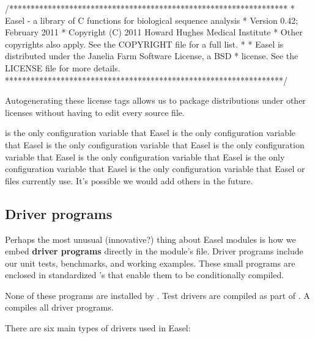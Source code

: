 \begin{cchunk}
/*****************************************************************
 * Easel - a library of C functions for biological sequence analysis
 * Version 0.42; February 2011
 * Copyright (C) 2011 Howard Hughes Medical Institute
 * Other copyrights also apply. See the COPYRIGHT file for a full list.
 *
 * Easel is distributed under the Janelia Farm Software License, a BSD
 * license. See the LICENSE file for more details.
 *****************************************************************/
\end{cchunk}

Autogenerating these license tags allows us to package distributions
under other licenses without having to edit every source file.

 is the only configuration variable that Easel
 is the only configuration variable that Easel
 is the only configuration variable that Easel
 is the only configuration variable that Easel
\ccode{} is the only configuration variable that Easel
 is the only configuration variable that Easel
 is the only configuration variable that Easel
 or  files currently use. It's possible we would
add others in the future.


\subsection{Driver programs}

Perhaps the most unusual (innovative?) thing about Easel modules is
how we embed {\bfseries driver programs} directly in the module's
 file. Driver programs include our unit tests, benchmarks,
and working examples. These small programs are enclosed in
standardized 's that enable them to be conditionally
compiled.

None of these programs are installed by .  Test
drivers are compiled as part of .  A  compiles all driver programs.

There are six main types of drivers used in Easel:

